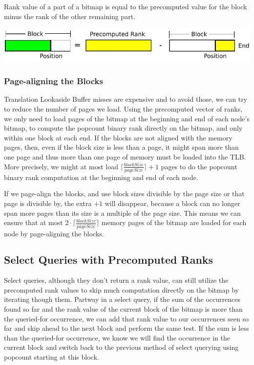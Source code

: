 \figureBegin
\caption{Rank value of a part of a bitmap is equal to the precomputed value for the block minus the rank of the other remaining part.}
\label{fig:PrecomputePopcountBlock}
\includegraphics[width=\textwidth]{PrecomputePopcountBlock.pdf}
\figureEnd



\subsubsection{Page-aligning the Blocks}
Translation Lookaside Buffer misses are expensive and to avoid those, we can try to reduce the number of pages we load.
Using the precomputed vector of ranks, we only need to load pages of the bitmap at the beginning and end of each node's bitmap, to compute the popcount binary rank directly on the bitmap, and only within one block at each end.
If the blocks are not aligned with the memory pages, then, even if the block size is less than a page, it might span more than one page and thus more than one page of memory must be loaded into the TLB.
More precisely, we might at most load $\lceil\frac{blockSize}{pageSize}\rceil +1$ pages to do the popcount binary rank computation at the beginning and end of each node.

If we page-align the blocks, and use block sizes divisible by the page size or that page is divisible by, the extra $+1$ will disappear, because a block can no longer span more pages than its size is a multiple of the page size.
This means we can ensure that at most $2 \cdot \lceil\frac{blockSize}{pageSize}\rceil$ memory pages of the bitmap are loaded for each node by page-aligning the blocks.



\subsection{Select Queries with Precomputed Ranks}
Select queries, although they don't return a rank value, can still utilize the precomputed rank values to skip much computation directly on the bitmap by iterating though them.
Partway in a select query, if the sum of the occurrences found so far and the rank value of the current block of the bitmap is more than the queried-for occurrence, we can add that rank value to our occurrences seen so far and skip ahead to the next block and perform the same test.
If the sum is less than the queried-for occurrence, we know we will find the occurrence in the current block and switch back to the previous method of select querying using popcount starting at this block.


